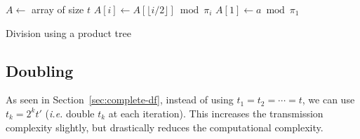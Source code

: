 \documentclass{llncs}
\newcommand{\ie}{\textit{i.e.}\xspace}
\begin{document}
\begin{algorithm}
\newcommand{\vstart}{\ensuremath{\mathrm{start}}}
\newcommand{\vmid}{\ensuremath{\mathrm{mid}}}
\newcommand{\vend}{\ensuremath{\mathrm{end}}}
\begin{algorithmic}[1]
\State $A \gets $ array of size $t$
    \State $A[i] \gets A[\lfloor i/2 \rfloor] \bmod \pi_i$
    \State {}
    \State {}
  \EndIf
\EndFunction
\State $A[1] \gets a \bmod \pi_1$
\State {}
\State {}
\end{algorithmic}
\caption{Division using a product tree}
\label{alg:div-prod-tree}
\end{algorithm}

\subsection{Doubling}
\label{sec:doubling}

As seen in Section~\ref{sec:complete-df}, instead of using $t_1 = t_2 = \cdots = t$, we can use $t_k = 2^k t'$ (\ie double $t_k$ at each iteration).
This increases the transmission complexity slightly, but drastically reduces the computational complexity.
\end{document}
